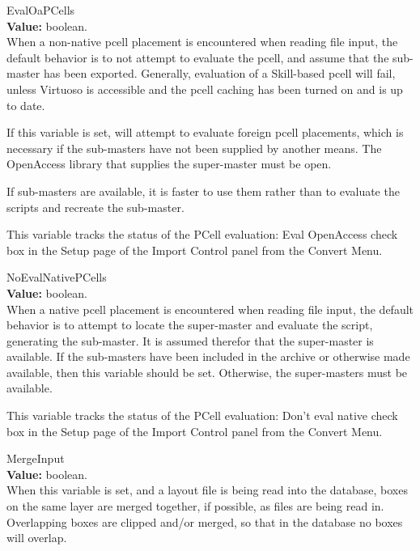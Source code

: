 \begin{description}
\item{\et EvalOaPCells}\\
{\bf Value:} boolean.\\
When a non-native pcell placement is encountered when reading file
input, the default behavior is to not attempt to evaluate the pcell,
and assume that the sub-master has been exported.  Generally,
evaluation of a Skill-based pcell will fail, unless Virtuoso is
accessible and the pcell caching has been turned on and is up to date.
 
If this variable is set, {\Xic} will attempt to evaluate foreign pcell
placements, which is necessary if the sub-masters have not been
supplied by another means.  The OpenAccess library that supplies the
super-master must be open.
 
If sub-masters are available, it is faster to use them rather than
to evaluate the scripts and recreate the sub-master.
 
This variable tracks the status of the {\cb PCell evaluation:  Eval
OpenAccess} check box in the {\cb Setup} page of the {\cb Import
Control} panel from the {\cb Convert Menu}.

\item{\et NoEvalNativePCells}\\
{\bf Value:} boolean.\\
When a native pcell placement is encountered when reading file input,
the default behavior is to attempt to locate the super-master and
evaluate the script, generating the sub-master.  It is assumed
therefor that the super-master is available.  If the sub-masters have
been included in the archive or otherwise made available, then this
variable should be set.  Otherwise, the super-masters must be
available.

This variable tracks the status of the {\cb PCell evaluation:  Don't
eval native} check box in the {\cb Setup} page of the {\cb Import
Control} panel from the {\cb Convert Menu}.

\item{\et MergeInput}\\
{\bf Value:} boolean.\\
When this variable is set, and a layout file is being read into the
database, boxes on the same layer are merged together, if possible, as
files are being read in.  Overlapping boxes are clipped and/or merged,
so that in the database no boxes will overlap.
 

\end{description}
